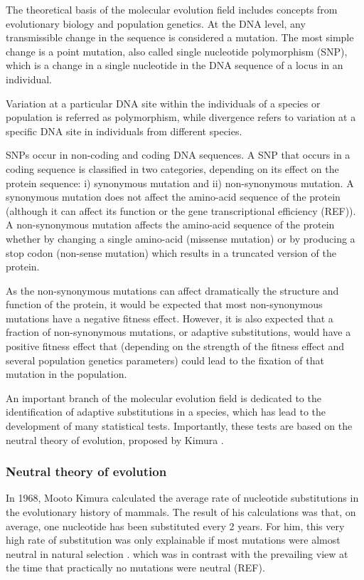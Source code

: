 The theoretical basis of the molecular evolution field includes concepts from evolutionary biology and population genetics. At the DNA level, any transmissible change in the sequence is considered a mutation. 
The most simple change is a point mutation, also called single nucleotide polymorphism (SNP),
which is a change in a single nucleotide in the DNA sequence of a locus in an individual.

Variation at a particular DNA site within the individuals of a species or population is referred as polymorphism, while divergence refers to variation at a specific DNA site in individuals from different species.

SNPs occur in non-coding and coding DNA sequences. A SNP that occurs in a coding sequence is classified in two categories, depending on its effect on the protein sequence: i) synonymous mutation and ii) non-synonymous mutation.
A synonymous mutation does not affect the amino-acid sequence of the protein (although it can affect its function 
	\citealp{Kimchi-Sarfaty2007} or the gene transcriptional efficiency (REF)).
A non-synonymous mutation affects the amino-acid sequence of the protein whether by changing a single amino-acid (missense mutation) or by producing a stop codon (non-sense mutation) which results in a truncated version of the protein.

As the non-synonymous mutations can affect dramatically the structure and function of the protein, it would be expected that most non-synonymous mutations have a negative fitness effect.
However, it is also expected that a fraction of non-synonymous mutations, or adaptive substitutions, would have a positive fitness effect that (depending on the strength of the fitness effect and several population genetics parameters) could lead to the fixation of that mutation in the population.

An important branch of the molecular evolution field is dedicated to the identification of adaptive substitutions in a species, which has lead to the development of many statistical tests. 
Importantly, these tests are based on the neutral theory of evolution, proposed by Kimura
	\citep{Kimura1968}.

\subsubsection{Neutral theory of evolution}
In 1968, Mooto Kimura calculated the average rate of nucleotide substitutions in the evolutionary history of mammals.
The result of his calculations was that, on average, one nucleotide has been substituted every 2 years.
For him, this very high rate of substitution was only explainable if most mutations were almost neutral in natural selection 
	\citep{Kimura1968}.
which was in contrast with the prevailing view at the time that practically no mutations were neutral (REF).

